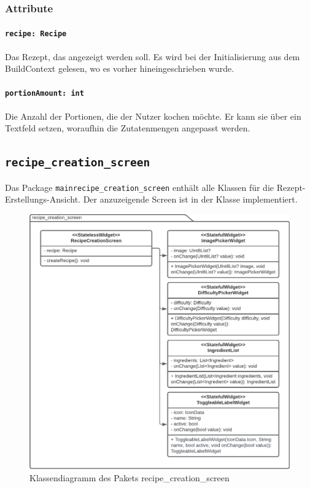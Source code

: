 \documentclass{entwurfsheft}
\begin{document}
\begin{sloppypar}
\subsubsection*{Attribute}
\paragraph{\texttt{recipe: Recipe}}
Das Rezept, das angezeigt werden soll. Es wird bei der Initialisierung aus dem \Gls{BuildContext} gelesen, wo es vorher hineingeschrieben wurde.
\paragraph{\texttt{portionAmount: int}}
Die Anzahl der Portionen, die der Nutzer kochen möchte. Er kann sie über ein Textfeld setzen, woraufhin die Zutatenmengen angepasst werden.
\newpage

\subsection{\texttt{recipe\_creation\_screen}}
Das Package \texttt{mainrecipe\_creation\_screen} enthält alle Klassen für die Rezept-Erstellungs-Ansicht. Der anzuzeigende Screen ist in der Klasse  implementiert.
\begin{figure}
    [htp]
    \centering
    \includegraphics[width=\textwidth]{images/presentationLayer/classDiagrams/recipeCreationScreenWhole.pdf}
    \caption{Klassendiagramm des Pakets recipe\_creation\_screen}
\end{figure}
\newpage

\end{sloppypar}
\end{document}
